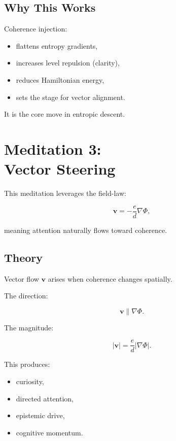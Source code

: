 \documentclass[12pt]{article}
\begin{document}
\section{Why This Works}

Coherence injection:

\begin{itemize}
    \item flattens entropy gradients,
    \item increases level repulsion (clarity),
    \item reduces Hamiltonian energy,
    \item sets the stage for vector alignment.
\end{itemize}

It is the core move in entropic descent.

\newpage


\chapter{Meditation 3:\\ Vector Steering}

This meditation leverages the field-law:

\[
\mathbf{v} = -\frac{e}{d}\nabla\Phi,
\]

meaning attention naturally flows toward coherence.

\section{Theory}

Vector flow $\mathbf{v}$ arises when coherence changes spatially.

The direction:

\[
\mathbf{v} \parallel \nabla\Phi.
\]

The magnitude:

\[
|\mathbf{v}| = \frac{e}{d} |\nabla\Phi|.
\]

This produces:

\begin{itemize}
    \item curiosity,
    \item directed attention,
    \item epistemic drive,
    \item cognitive momentum.
\end{itemize}
\end{document}
